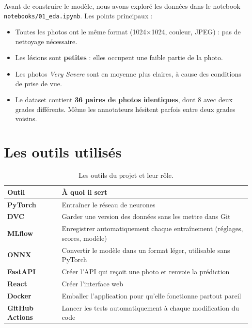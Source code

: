 \documentclass[11pt,a4paper]{report}
\begin{document}
Avant de construire le modèle, nous avons exploré les données dans le notebook
\texttt{notebooks/01\_eda.ipynb}. Les points principaux :
\begin{itemize}[noitemsep,topsep=4pt]
    \item Toutes les photos ont le même format (1024×1024, couleur, JPEG) : pas de nettoyage nécessaire.
    \item Les lésions sont \textbf{petites} : elles occupent une faible partie de la photo.
    \item Les photos \textit{Very Severe} sont en moyenne plus claires, à cause des conditions de prise de vue.
    \item Le dataset contient \textbf{36 paires de photos identiques}, dont 8 avec deux grades différents. Même les annotateurs hésitent parfois entre deux grades voisins.
\end{itemize}

\section{Les outils utilisés}

\begin{table}[H]
    \centering
    \caption{Les outils du projet et leur rôle.}
    \label{tab:outils}
    \begin{tabular}{>{\bfseries}l p{10.5cm}}
        \toprule
        \textbf{Outil} & \textbf{À quoi il sert} \\
        \midrule
        PyTorch      & Entraîner le réseau de neurones \\
        DVC          & Garder une version des données sans les mettre dans Git \\
        MLflow       & Enregistrer automatiquement chaque entraînement (réglages, scores, modèle) \\
        ONNX         & Convertir le modèle dans un format léger, utilisable sans PyTorch \\
        FastAPI      & Créer l'API qui reçoit une photo et renvoie la prédiction \\
        React        & Créer l'interface web \\
        Docker       & Emballer l'application pour qu'elle fonctionne partout pareil \\
        GitHub Actions & Lancer les tests automatiquement à chaque modification du code \\
        \bottomrule
    \end{tabular}
\end{table}
\end{document}
